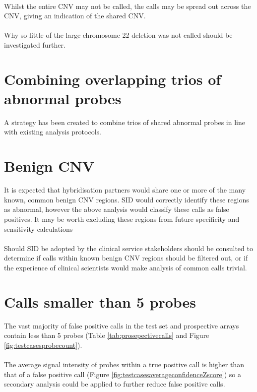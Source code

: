 \paragraph*{}
Whilst the entire CNV may not be called, the calls may be spread out across the CNV, giving an indication of the shared CNV.
\paragraph*{}
Why so little of the large chromosome 22 deletion was not called should be investigated further.

\section{Combining overlapping trios of abnormal probes}
A strategy has been created to combine trios of shared abnormal probes in line with existing analysis protocols.

\section{Benign CNV}
It is expected that hybridisation partners would share one or more of the many known, common benign CNV regions. SID would correctly identify these regions as abnormal, however the above analysis would classify these calls as false positives. It may be worth excluding these regions from future specificity and sensitivity calculations
\paragraph*{}
Should SID be adopted by the clinical service stakeholders should be consulted to determine if calls within known benign CNV regions should be filtered out, or  if the experience of clinical scientists would make analysis of common calls trivial.


\section{Calls smaller than 5 probes}
The vast majority of false positive calls in the test set and prospective arrays contain less than 5 probes (Table \ref{tab:prosepectivecalls} and Figure \ref{fig:testcasesprobecount}). 
\paragraph*{}
The average signal intensity of probes within a true positive call is higher than that of a false positive call (Figure \ref{fig:testcasesaverageconfidenceZscore}) so a secondary analysis could be applied to further reduce false positive calls. 


